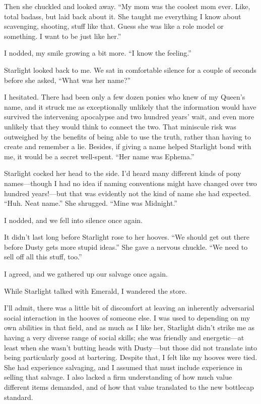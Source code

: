 Then she chuckled and looked away. “My mom was the coolest mom ever. Like, total badass, but laid back about it. She taught me everything I know about scavenging, shooting, stuff like that. Guess she was like a role model or something. I want to be just like her.”

I nodded, my smile growing a bit more. “I know the feeling.”

Starlight looked back to me. We sat in comfortable silence for a couple of seconds before she asked, “What was her name?”

I hesitated. There had been only a few dozen ponies who knew of my Queen’s name, and it struck me as exceptionally unlikely that the information would have survived the intervening apocalypse and two hundred years’ wait, and even more unlikely that they would think to connect the two. That miniscule risk was outweighed by the benefits of being able to use the truth, rather than having to create and remember a lie. Besides, if giving a name helped Starlight bond with me, it would be a secret well-spent. “Her name was Ephema.”

Starlight cocked her head to the side. I’d heard many different kinds of pony names—though I had no idea if naming conventions might have changed over two hundred years!—but that was evidently not the kind of name she had expected. “Huh. Neat name.” She shrugged. “Mine was Midnight.”

I nodded, and we fell into silence once again.

It didn’t last long before Starlight rose to her hooves. “We should get out there before Dusty gets more stupid ideas.” She gave a nervous chuckle. “We need to sell off all this stuff, too.”

I agreed, and we gathered up our salvage once again.

{\br}%
While Starlight talked with Emerald, I wandered the store.

I’ll admit, there was a little bit of discomfort at leaving an inherently adversarial social interaction in the hooves of someone else. I was used to depending on my own abilities in that field, and as much as I like her, Starlight didn’t strike me as having a very diverse range of social skills; she was friendly and energetic—at least when she wasn’t butting heads with Dusty—but those did not translate into being particularly good at bartering. Despite that, I felt like my hooves were tied. She had experience salvaging, and I assumed that must include experience in selling that salvage. I also lacked a firm understanding of how much value different items demanded, and of how that value translated to the new bottlecap standard.

